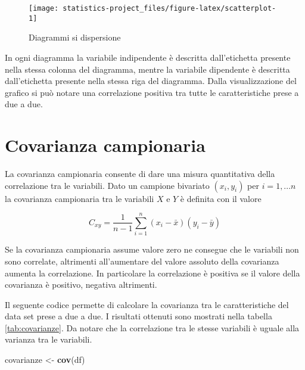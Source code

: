 \documentclass[]{book}
\newenvironment{Shaded}{\begin{snugshade}}{\end{snugshade}}
\newcommand{\KeywordTok}[1]{\textcolor[rgb]{0.13,0.29,0.53}{\textbf{#1}}}
\newcommand{\StringTok}[1]{\textcolor[rgb]{0.31,0.60,0.02}{#1}}
\newcommand{\NormalTok}[1]{#1}
\begin{document}
\begin{figure}

{\centering \texttt{[image: statistics-project\_files/figure-latex/scatterplot-1]} 

}

\caption{Diagrammi si dispersione}\label{fig:scatterplot}
\end{figure}

In ogni diagramma la variabile indipendente è descritta dall'etichetta
presente nella stessa colonna del diagramma, mentre la variabile
dipendente è descritta dall'etichetta presente nella stessa riga del
diagramma. Dalla visualizzazione del grafico si può notare una
correlazione positiva tra tutte le caratteristiche prese a due a due.

\section{Covarianza campionaria}\label{covarianza-campionaria}

La covarianza campionaria consente di dare una misura quantitativa della
correlazione tra le variabili. Dato un campione bivariato \((x_i, y_i)\)
per \(i=1,...n\) la covarianza campionaria tra le variabili \(X\) e
\(Y\) è definita con il valore

\[C_{xy}=\frac{1}{n-1}\sum_{i=1}^{n}(x_i-\bar{x})(y_i-\bar{y})\]

Se la covarianza campionaria assume valore zero ne consegue che le
variabili non sono correlate, altrimenti all'aumentare del valore
assoluto della covarianza aumenta la correlazione. In particolare la
correlazione è positiva se il valore della covarianza è positivo,
negativa altrimenti.

Il seguente codice permette di calcolare la covarianza tra le
caratteristiche del data set prese a due a due. I risultati ottenuti
sono mostrati nella tabella \ref{tab:covarianze}. Da notare che la
correlazione tra le stesse variabili è uguale alla varianza tra le
variabili.

\begin{Shaded}
\begin{Highlighting}[]
\NormalTok{covarianze <-}\StringTok{ }\KeywordTok{cov}\NormalTok{(df)}
\end{Highlighting}
\end{Shaded}
\end{document}
